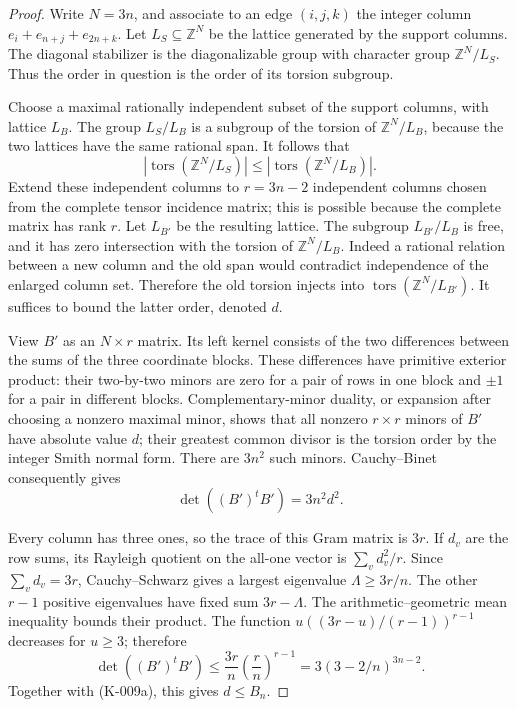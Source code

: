 \begin{proof}
Write $N=3n$, and associate to an edge $(i,j,k)$ the integer column
$e_i+e_{n+j}+e_{2n+k}$.  Let $L_S\subseteq\mathbb Z^N$ be the
lattice generated by the support columns.  The diagonal stabilizer
is the diagonalizable group with character group $\mathbb Z^N/L_S$.
Thus the order in question is the order of its torsion subgroup.

Choose a maximal rationally independent subset of the support
columns, with lattice $L_B$.  The group $L_S/L_B$ is a subgroup of
the torsion of $\mathbb Z^N/L_B$, because the two lattices have the
same rational span.  It follows that
\[
 |\operatorname{tors}(\mathbb Z^N/L_S)|
 \le |\operatorname{tors}(\mathbb Z^N/L_B)|.
\]
Extend these independent columns to $r=3n-2$ independent columns
chosen from the complete tensor incidence matrix; this is possible
because the complete matrix has rank $r$.  Let $L_{B'}$ be the
resulting lattice.  The subgroup $L_{B'}/L_B$ is free, and it has
zero intersection with the torsion of $\mathbb Z^N/L_B$.
Indeed a rational relation between a new column and the old span
would contradict independence of the enlarged column set.
Therefore the old torsion injects into
$\operatorname{tors}(\mathbb Z^N/L_{B'})$.
It suffices to bound the latter order, denoted $d$.

View $B'$ as an $N\times r$ matrix.  Its left kernel consists of
the two differences between the sums of the three coordinate
blocks.  These differences have primitive exterior product:
their two-by-two minors are zero for a pair of rows in one block
and $\pm1$ for a pair in different blocks.  Complementary-minor
duality, or expansion after choosing a nonzero maximal minor,
shows that all nonzero $r\times r$ minors of $B'$ have absolute
value $d$; their greatest common divisor is the torsion order
by the integer Smith normal form.  There are $3n^2$ such minors.
Cauchy--Binet consequently gives
\[
             \det((B')^t B')=3n^2d^2.                 \tag{K-009a}
\]

Every column has three ones, so the trace of this Gram matrix is
$3r$.  If $d_v$ are the row sums, its Rayleigh quotient on the
all-one vector is $\sum_v d_v^2/r$.  Since $\sum_vd_v=3r$,
Cauchy--Schwarz gives a largest eigenvalue $\Lambda\ge3r/n$.
The other $r-1$ positive eigenvalues have fixed sum $3r-\Lambda$.
The arithmetic--geometric mean inequality bounds their product.
The function $u((3r-u)/(r-1))^{r-1}$ decreases for $u\ge3$;
therefore
\[
 \det((B')^tB')
 \le \frac{3r}{n}\left(\frac{r}{n}\right)^{r-1}
 =3(3-2/n)^{3n-2}.
\]
Together with (K-009a), this gives $d\le B_n$.


\end{proof}
